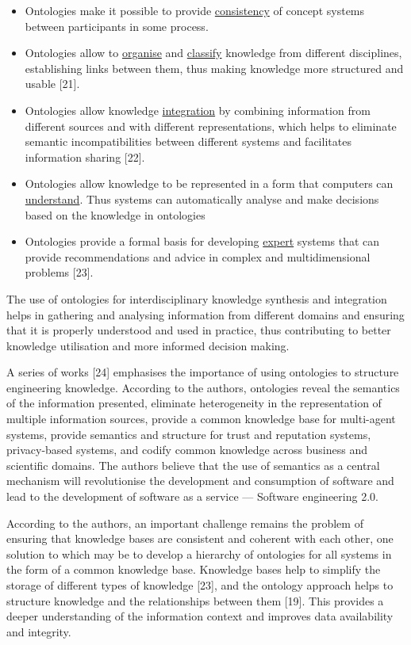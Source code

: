 \documentclass[a4paper]{article}
\begin{document}
\begin{multicols}{2}
\begin{itemize}[leftmargin=5mm]
        \item Ontologies make it possible to provide \underline{consistency}
of concept systems between participants in some
process.
        \item Ontologies allow to \underline{organise} and \underline{classify} knowledge
from different disciplines, establishing links between
them, thus making knowledge more structured and
usable [21].
        \item Ontologies allow knowledge \underline{integration} by combining information from different sources and with
different representations, which helps to eliminate
semantic incompatibilities between different systems
and facilitates information sharing [22].
        \item Ontologies allow knowledge to be represented in a
form that computers can \underline{understand}. Thus systems
can automatically analyse and make decisions based
on the knowledge in ontologies
        \item  Ontologies provide a formal basis for developing \underline{expert} systems that can provide recommendations and advice in complex and multidimensional problems [23].

\end{itemize}

{\fontsize{9.5}{13}\selectfont The use of ontologies for interdisciplinary knowledge synthesis and integration helps in gathering and
analysing information from different domains and ensuring that it is properly understood and used in practice,
thus contributing to better knowledge utilisation and
more informed decision making.
}

{\fontsize{9.5}{13}\selectfont A series of works [24] emphasises the importance
of using ontologies to structure engineering knowledge.
According to the authors, ontologies reveal the semantics
of the information presented, eliminate heterogeneity in
the representation of multiple information sources, provide a common knowledge base for multi-agent systems,
provide semantics and structure for trust and reputation
systems, privacy-based systems, and codify common
knowledge across business and scientific domains. The
authors believe that the use of semantics as a central
mechanism will revolutionise the development and consumption of software and lead to the development of
software as a service — Software engineering 2.0.
}

\newpage \nohyphens{\fontsize{9.8}{13}\selectfont\setlength{\parindent}{0pt}According to the authors, an important challenge remains the problem of ensuring that knowledge bases are
consistent and coherent with each other, one solution to
which may be to develop a hierarchy of ontologies for
all systems in the form of a common knowledge base.
Knowledge bases help to simplify the storage of different
types of knowledge [23], and the ontology approach helps
to structure knowledge and the relationships between
them [19]. This provides a deeper understanding of the
information context and improves data availability and
integrity.} \par


\end{multicols}
\end{document}
